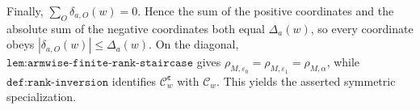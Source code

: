 Finally, \(\sum_O\delta_{a,O}(w)=0\). Hence the sum of the positive coordinates and the absolute sum of the negative coordinates both equal \(\Delta_a(w)\), so every coordinate obeys \(|\delta_{a,O}(w)|\le\Delta_a(w)\). On the diagonal, \(\texttt{lem:armwise-finite-rank-staircase}\) gives \(\rho_{M,\varepsilon_0}=\rho_{M,\varepsilon_1}=\rho_{M,\alpha}\), while \(\texttt{def:rank-inversion}\) identifies \(\mathcal C^{\boldsymbol\varepsilon}_w\) with \(\mathcal C_w\). This yields the asserted symmetric specialization.